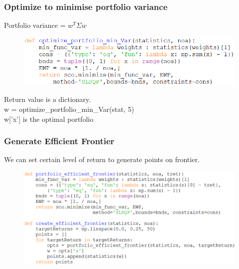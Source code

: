 \documentclass{beamer}
\begin{document}
\begin{frame}
\frametitle{Optimize to minimise portfolio variance}
\begin{center}
Portfolio variance = $ w^{T} \Sigma w $
\end{center}
\begin{figure}[H]
	\includegraphics[scale=0.48]{optimize_min_Var.png}
\end{figure}
\begin{center}
Return value is a dictionary.\\
w = optimize\_portfolio\_min\_Var(stat, 5) \\
w['x'] is the optimal portfolio
\end{center}
\end{frame}

\begin{frame}
\frametitle{Generate Efficient Frontier}
We can set certain level of return to generate points on frontier.
\begin{figure}[H]
	\includegraphics[scale=0.44]{generate_efficient_frontier.png}
\end{figure}
\end{frame}
\end{document}
